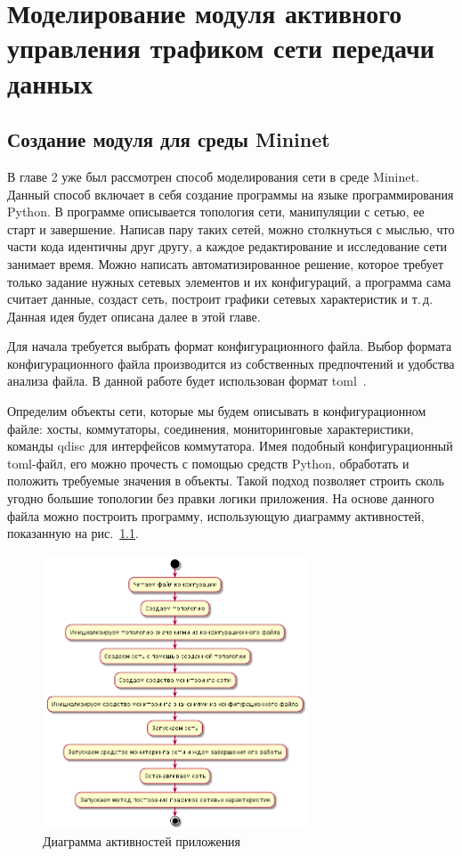 \chapter{Моделирование модуля активного управления
  трафиком сети передачи данных}

\section{Создание модуля для среды Mininet}

В главе 2 уже был рассмотрен способ моделирования сети в среде
Mininet.  Данный способ включает в себя создание программы на языке
программирования Python. В программе описывается топология сети,
манипуляции с сетью, ее старт и завершение. Написав пару таких сетей,
можно столкнуться с мыслью, что части кода идентичны друг другу, а
каждое редактирование и исследование сети занимает время. Можно
написать автоматизированное решение, которое требует только задание
нужных сетевых элементов и их конфигураций, а программа сама считает
данные, создаст сеть, построит графики сетевых характеристик и
т.\,д. Данная идея будет описана далее в этой главе.

Для начала требуется выбрать формат конфигурационного файла. Выбор
формата конфигурационного файла производится из собственных
предпочтений и удобства анализа файла. В данной работе будет
использован формат toml~\cite{toml}.

Определим объекты сети, которые мы будем описывать в конфигурационном
файле: хосты, коммутаторы, соединения, мониторинговые характеристики,
команды qdisc для интерфейсов коммутатора.  Имея подобный
конфигурационный toml-файл, его можно прочесть с помощью средств
Python, обработать и положить требуемые значения в объекты.  Такой
подход позволяет строить сколь угодно большие топологии без правки
логики приложения. На основе данного файла можно построить программу,
использующую диаграмму активностей, показанную на рис.~\ref{fig:30001}.

\begin{figure}[!h]
  \centering \includegraphics[width=0.7\textwidth]{image/act_dia.png}
  \caption{Диаграмма активностей приложения}
  \label{fig:30001}
\end{figure}


